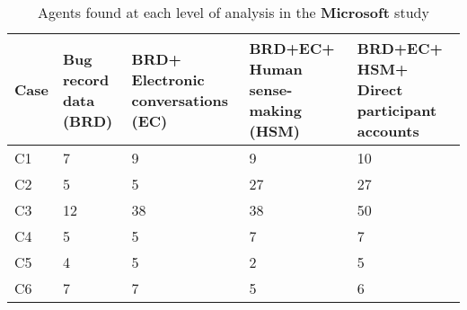 \begin{table}[tbp]
\caption{\label{tab:MicrosoftAgents} Agents found at each level of analysis in the \textbf{Microsoft} study}
\centering
\footnotesize{\begin{tabular}{p{1.4cm}p{2.4cm}p{2.4cm}p{2.4cm}p{2.4cm}}
\hline \hline
\vspace{0.5pt} \bfseries Case & \vspace{0.5pt} \bfseries Bug record data (BRD) & \vspace{0.5pt} \bfseries BRD+ Electronic conversations (EC) & \vspace{0.5pt} \bfseries BRD+EC+ Human sense-making (HSM) & \vspace{0.5pt} \bfseries BRD+EC+ HSM+ Direct participant accounts \\
\hline
\vspace{0.5pt} C1 & \vspace{0.5pt} 7 & \vspace{0.5pt} 9 & \vspace{0.5pt} 9 & \vspace{0.5pt} 10 \\
\hline
\vspace{0.5pt} C2 & \vspace{0.5pt} 5 & \vspace{0.5pt} 5 & \vspace{0.5pt} 27 & \vspace{0.5pt} 27 \\
\hline
\vspace{0.5pt} C3 & \vspace{0.5pt} 12 & \vspace{0.5pt} 38 & \vspace{0.5pt} 38 & \vspace{0.5pt} 50 \\
\hline
\vspace{0.5pt} C4 & \vspace{0.5pt} 5 & \vspace{0.5pt} 5 & \vspace{0.5pt} 7 & \vspace{0.5pt} 7 \\
\hline
\vspace{0.5pt} C5 & \vspace{0.5pt} 4 & \vspace{0.5pt} 5 & \vspace{0.5pt} 2 & \vspace{0.5pt} 5 \\
\hline
\vspace{0.5pt} C6 & \vspace{0.5pt} 7 & \vspace{0.5pt} 7 & \vspace{0.5pt} 5 & \vspace{0.5pt} 6 \\

\end{tabular}}
\end{table}
